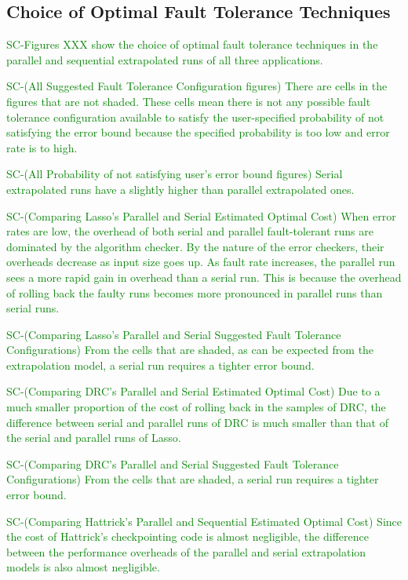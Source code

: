 \documentclass{sig-alternate}
\newcommand{\sui}[1]{%
  \textcolor{green}{SC-#1}
}
\begin{document}
{\subsection{Choice of Optimal Fault Tolerance Techniques}
\label{sec:eval:optchoice}

\sui{Figures XXX show the choice of optimal fault tolerance techniques in the parallel and sequential extrapolated runs of all three applications.}

\sui{(All Suggested Fault Tolerance Configuration figures)
There are cells in the figures that are not shaded. These cells mean there is not any possible fault tolerance configuration available to satisfy the user-specified probability of not satisfying the error bound because the specified probability is too low and error rate is to high.}

\sui{(All Probability of not satisfying user's error bound figures)
Serial extrapolated runs have a slightly higher than parallel extrapolated ones.}

\sui{(Comparing Lasso's Parallel and Serial Estimated Optimal Cost)
When error rates are low, the overhead of both serial and parallel fault-tolerant runs are dominated by the algorithm checker. By the nature of the error checkers, their overheads decrease as input size goes up.
As fault rate increases, the parallel run sees a more rapid gain in overhead than a serial run. This is because the overhead of rolling back the faulty runs becomes more pronounced in parallel runs than serial runs.}

\sui{(Comparing Lasso's Parallel and Serial Suggested Fault Tolerance Configurations)
From the cells that are shaded, as can be expected from the extrapolation model, a serial run requires a tighter error bound. }

\sui{(Comparing DRC's Parallel and Serial Estimated Optimal Cost)
Due to a much smaller proportion of the cost of rolling back in the samples of DRC, the difference between serial and parallel runs of DRC is much smaller than that of the serial and parallel runs of Lasso.}

\sui{(Comparing DRC's Parallel and Serial Suggested Fault Tolerance Configurations)
From the cells that are shaded, a serial run requires a tighter error bound.}

\sui{(Comparing Hattrick's Parallel and Sequential Estimated Optimal Cost)
Since the cost of Hattrick's checkpointing code is almost negligible, the difference between the performance overheads of the parallel and serial extrapolation models is also almost negligible.}

}
\end{document}
